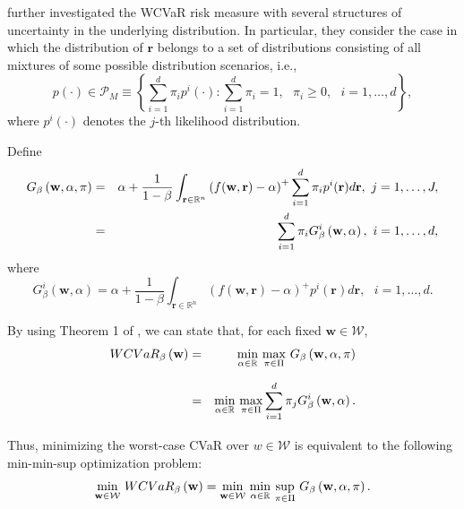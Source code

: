 \documentclass[a4paper,10pt]{article}
\begin{document}
\citet*{zhu2009worst} further investigated the WCVaR risk measure with several structures of uncertainty in the underlying distribution. In particular, they consider the case in which the distribution of $\mathbf{r}$ belongs to a set of distributions consisting of all mixtures of some possible distribution scenarios, i.e.,
\begin{equation}
p\left( \cdot \right) \in \mathcal{P}_{M}\equiv \left\{ \sum_{i=1}^{d}\pi_{i}p^{i}\left( \cdot \right) :\sum_{i=1}^{d}\pi _{i}=1,\text{ }\pi _{i}\geq 0,\text{ }i=1,\ldots,d\right\},\label{15}
\end{equation}
where $p^{i}\left( \cdot \right) $ denotes the $j$-th likelihood distribution.

Define 
\begin{eqnarray}
G_{\beta }\left( \mathbf{w},\alpha ,\pi \right) &=&\alpha +\frac{1}{1-\beta }%
\int_{\mathbf{r}\in	\mathbb{R}^{n}}\left( f(\mathbf{w},\mathbf{r})-\alpha \right) ^{+}\sum_{i=1}^{d}\pi_{i}p^{i}(\mathbf{r})d\mathbf{r},\text{ }j=1,\ldots,J,  \notag \\
&=&\sum_{i=1}^{d}\pi _{i}G_{\beta }^{i}\left( \mathbf{w},\alpha \right) ,%
\text{ }i=1,\ldots,d,  \label{16}
\end{eqnarray}
where
\begin{equation}
G_{\beta }^{i}\left( \mathbf{w},\alpha \right) =\alpha +\frac{1}{1-\beta }%
\int_{\mathbf{r}\in\mathbb{R}^{n}}\left( f(\mathbf{w},\mathbf{r})-\alpha \right) ^{+}p^{i}(\mathbf{r})d
\mathbf{r},\text{ }i=1,\ldots,d.  \label{17}
\end{equation}

By using Theorem 1 of \citet*{zhu2009worst}, we can state that, for each fixed $\mathbf{w}\in \mathcal{W}$, 
\begin{eqnarray}
WCVaR_{\beta }\left( \mathbf{w}\right) &=&\underset{}{\underset{\alpha \in\mathbb{R}}{\min }~\underset{\pi \in \Pi }{\max }}~G_{\beta }\left( \mathbf{w},\alpha
,\pi \right)  \notag \\
&=&\underset{}{\underset{\alpha \in	\mathbb{R}}{\min }~\underset{\pi \in \Pi }{\max }}\sum_{i=1}^{d}\pi _{j}G_{\beta
}^{i}\left( \mathbf{w},\alpha \right).  \label{18}
\end{eqnarray}%

Thus, minimizing the worst-case CVaR over $w\in \mathcal{W}$ is equivalent to the following min-min-sup optimization problem:
\begin{equation}
\underset{}{\underset{\mathbf{w}\in \mathcal{W}}{\min }}~WCVaR_{\beta
}\left( \mathbf{w}\right) =\underset{}{\underset{\mathbf{w}\in \mathcal{W}}{%
		\min }~\underset{\alpha \in	\mathbb{R}}{\min }~\underset{\pi \in \Pi }{\sup }}~G_{\beta }\left( \mathbf{w},\alpha,\pi \right) .  \label{19}
\end{equation}
\end{document}
